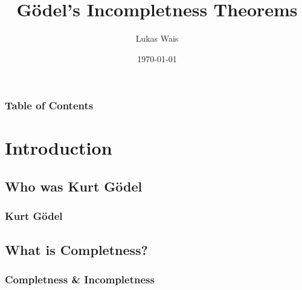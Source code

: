 \documentclass[aspectratio=169]{beamer}
\title{Gödel's Incompletness Theorems}
\author{Lukas Wais}
\institute{Course 326.901}
\date{\today}
\begin{document}
\frame{\titlepage}
\begin{frame}
	\frametitle{Table of Contents}
	\tableofcontents
\end{frame}
\section{Introduction}
\subsection{Who was Kurt Gödel}
\begin{frame}
	\frametitle{Kurt Gödel}
\end{frame}
\subsection{What is Completness?}
\begin{frame}
	\frametitle{Completness \& Incompletness}
\end{frame}
\end{document}
